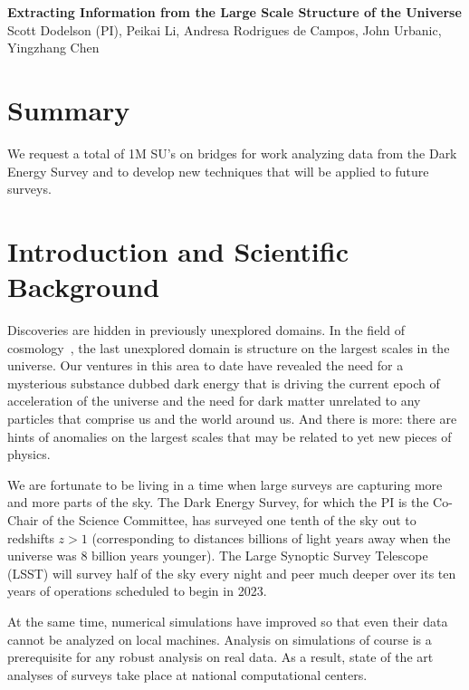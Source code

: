 \documentclass[12pt]{article}
\begin{document}
\topmargin=-2.105cm
\oddsidemargin=-0.1cm
\evensidemargin=0cm

\begin{center}
{\bf Extracting Information from the Large Scale Structure of the Universe\\}
Scott Dodelson (PI), Peikai Li, Andresa Rodrigues de Campos, John Urbanic, Yingzhang Chen
\end{center}

\begin{small}


\section*{Summary} We request a total of 1M SU's on bridges for work analyzing data from the Dark Energy Survey and to develop new techniques that will be applied to future surveys.

\section{Introduction and Scientific Background}

Discoveries are hidden in previously unexplored domains. In the field of cosmology~\cite{Dodelson:2003ft}, the last unexplored domain is structure on the largest scales in the universe. Our ventures in this area to date have revealed the need for a mysterious substance dubbed dark energy that is driving the current epoch of acceleration of the universe and the need for dark matter unrelated to any particles that comprise us and the world around us. And there is more: there are hints of anomalies on the largest scales that may be related to yet new pieces of physics. 

We are fortunate to be living in a time when large surveys are capturing more and more parts of the sky. The Dark Energy Survey, for which the PI is the Co-Chair of the Science Committee, has surveyed one tenth of the sky out to redshifts $z>1$ (corresponding to distances billions of light years away when the universe was 8 billion years younger). The Large Synoptic Survey Telescope (LSST) will survey half of the sky every night and peer much deeper over its ten years of operations scheduled to begin in 2023. 

At the same time, numerical simulations have improved so that even their data cannot be analyzed on local machines. Analysis on simulations of course is a prerequisite for any robust analysis on real data. As a result, state of the art analyses of surveys take place at national computational centers.


\end{small}
\end{document}
